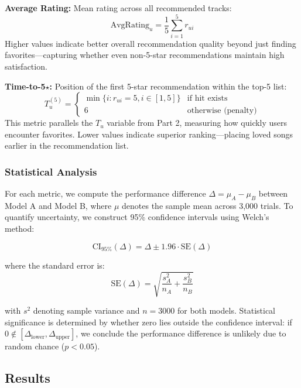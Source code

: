 \documentclass[12pt,a4paper]{article}
\begin{document}
\textbf{Average Rating:} Mean rating across all recommended tracks:
\begin{equation}
\text{AvgRating}_u = \frac{1}{5} \sum_{i=1}^{5} r_{ui}
\end{equation}
Higher values indicate better overall recommendation quality beyond just finding favorites—capturing whether even non-5-star recommendations maintain high satisfaction.

\textbf{Time-to-5$\star$:} Position of the first 5-star recommendation within the top-5 list:
\begin{equation}
T_u^{(5)} = \begin{cases}
\min\{i : r_{ui} = 5, i \in [1,5]\} & \text{if hit exists} \\
6 & \text{otherwise (penalty)}
\end{cases}
\end{equation}
This metric parallels the $T_u$ variable from Part 2, measuring how quickly users encounter favorites. Lower values indicate superior ranking—placing loved songs earlier in the recommendation list.

\subsubsection{Statistical Analysis}

For each metric, we compute the performance difference $\Delta = \mu_A - \mu_B$ between Model A and Model B, where $\mu$ denotes the sample mean across 3,000 trials. To quantify uncertainty, we construct 95\% confidence intervals using Welch's method:

\begin{equation}
\text{CI}_{95\%}(\Delta) = \Delta \pm 1.96 \cdot \text{SE}(\Delta)
\end{equation}

where the standard error is:
\begin{equation}
\text{SE}(\Delta) = \sqrt{\frac{s_A^2}{n_A} + \frac{s_B^2}{n_B}}
\end{equation}

with $s^2$ denoting sample variance and $n = 3000$ for both models. Statistical significance is determined by whether zero lies outside the confidence interval: if $0 \notin [\Delta_{\text{lower}}, \Delta_{\text{upper}}]$, we conclude the performance difference is unlikely due to random chance ($p < 0.05$).

\subsection{Results}
\end{document}
